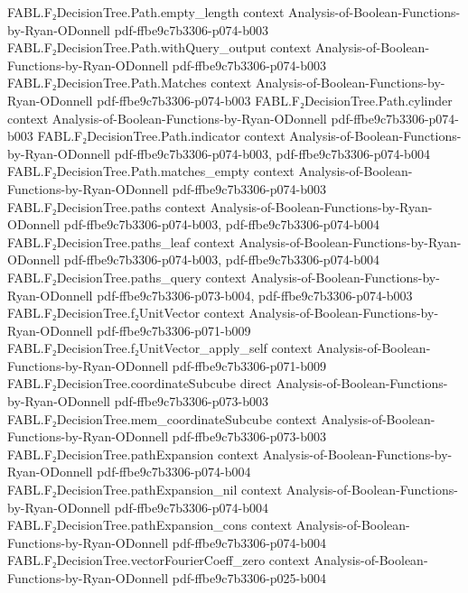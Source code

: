 \begin{theorem}
\proofstep
  {FABL.F₂DecisionTree.Path.empty_length}
  {context}
  {Analysis-of-Boolean-Functions-by-Ryan-ODonnell}
  {pdf-ffbe9c7b3306-p074-b003}
\proofstep
  {FABL.F₂DecisionTree.Path.withQuery_output}
  {context}
  {Analysis-of-Boolean-Functions-by-Ryan-ODonnell}
  {pdf-ffbe9c7b3306-p074-b003}
\proofstep
  {FABL.F₂DecisionTree.Path.Matches}
  {context}
  {Analysis-of-Boolean-Functions-by-Ryan-ODonnell}
  {pdf-ffbe9c7b3306-p074-b003}
\proofstep
  {FABL.F₂DecisionTree.Path.cylinder}
  {context}
  {Analysis-of-Boolean-Functions-by-Ryan-ODonnell}
  {pdf-ffbe9c7b3306-p074-b003}
\proofstep
  {FABL.F₂DecisionTree.Path.indicator}
  {context}
  {Analysis-of-Boolean-Functions-by-Ryan-ODonnell}
  {pdf-ffbe9c7b3306-p074-b003,
    pdf-ffbe9c7b3306-p074-b004}
\proofstep
  {FABL.F₂DecisionTree.Path.matches_empty}
  {context}
  {Analysis-of-Boolean-Functions-by-Ryan-ODonnell}
  {pdf-ffbe9c7b3306-p074-b003}
\proofstep
  {FABL.F₂DecisionTree.paths}
  {context}
  {Analysis-of-Boolean-Functions-by-Ryan-ODonnell}
  {pdf-ffbe9c7b3306-p074-b003,
    pdf-ffbe9c7b3306-p074-b004}
\proofstep
  {FABL.F₂DecisionTree.paths_leaf}
  {context}
  {Analysis-of-Boolean-Functions-by-Ryan-ODonnell}
  {pdf-ffbe9c7b3306-p074-b003,
    pdf-ffbe9c7b3306-p074-b004}
\proofstep
  {FABL.F₂DecisionTree.paths_query}
  {context}
  {Analysis-of-Boolean-Functions-by-Ryan-ODonnell}
  {pdf-ffbe9c7b3306-p073-b004,
    pdf-ffbe9c7b3306-p074-b003}
\proofstep
  {FABL.F₂DecisionTree.f₂UnitVector}
  {context}
  {Analysis-of-Boolean-Functions-by-Ryan-ODonnell}
  {pdf-ffbe9c7b3306-p071-b009}
\proofstep
  {FABL.F₂DecisionTree.f₂UnitVector_apply_self}
  {context}
  {Analysis-of-Boolean-Functions-by-Ryan-ODonnell}
  {pdf-ffbe9c7b3306-p071-b009}
\proofstep
  {FABL.F₂DecisionTree.coordinateSubcube}
  {direct}
  {Analysis-of-Boolean-Functions-by-Ryan-ODonnell}
  {pdf-ffbe9c7b3306-p073-b003}
\proofstep
  {FABL.F₂DecisionTree.mem_coordinateSubcube}
  {context}
  {Analysis-of-Boolean-Functions-by-Ryan-ODonnell}
  {pdf-ffbe9c7b3306-p073-b003}
\proofstep
  {FABL.F₂DecisionTree.pathExpansion}
  {context}
  {Analysis-of-Boolean-Functions-by-Ryan-ODonnell}
  {pdf-ffbe9c7b3306-p074-b004}
\proofstep
  {FABL.F₂DecisionTree.pathExpansion_nil}
  {context}
  {Analysis-of-Boolean-Functions-by-Ryan-ODonnell}
  {pdf-ffbe9c7b3306-p074-b004}
\proofstep
  {FABL.F₂DecisionTree.pathExpansion_cons}
  {context}
  {Analysis-of-Boolean-Functions-by-Ryan-ODonnell}
  {pdf-ffbe9c7b3306-p074-b004}
\proofstep
  {FABL.F₂DecisionTree.vectorFourierCoeff_zero}
  {context}
  {Analysis-of-Boolean-Functions-by-Ryan-ODonnell}
  {pdf-ffbe9c7b3306-p025-b004}

\end{theorem}
